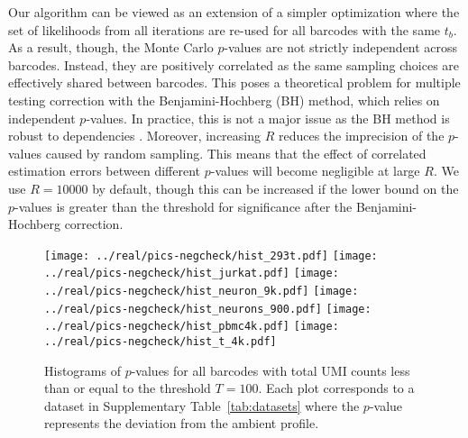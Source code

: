 \documentclass{article}
\begin{document}
Our algorithm can be viewed as an extension of a simpler optimization where the set of likelihoods from all iterations are re-used for all barcodes with the same $t_b$.
As a result, though, the Monte Carlo $p$-values are not strictly independent across barcodes.
Instead, they are positively correlated as the same sampling choices are effectively shared between barcodes.
This poses a theoretical problem for multiple testing correction with the Benjamini-Hochberg (BH) method, which relies on independent $p$-values.
In practice, this is not a major issue as the BH method is robust to dependencies \cite{reiner2003identifying,kim2008effects}.
Moreover, increasing $R$ reduces the imprecision of the $p$-values caused by random sampling.
This means that the effect of correlated estimation errors between different $p$-values will become negligible at large $R$.
We use $R=10000$ by default, though this can be increased if the lower bound on the $p$-values \cite{phipson2010permutation} is greater than the threshold for significance after the Benjamini-Hochberg correction.




\newpage
\begin{figure}[btp]
    \begin{center}
        \texttt{[image: ../real/pics-negcheck/hist\_293t.pdf]}
        \texttt{[image: ../real/pics-negcheck/hist\_jurkat.pdf]}
        \texttt{[image: ../real/pics-negcheck/hist\_neuron\_9k.pdf]}
        \texttt{[image: ../real/pics-negcheck/hist\_neurons\_900.pdf]}
        \texttt{[image: ../real/pics-negcheck/hist\_pbmc4k.pdf]}
        \texttt{[image: ../real/pics-negcheck/hist\_t\_4k.pdf]}
    \end{center}
    \caption{Histograms of $p$-values for all barcodes with total UMI counts less than or equal to the threshold $T=100$.
        Each plot corresponds to a dataset in Supplementary Table~\ref{tab:datasets} where the $p$-value represents the deviation from the ambient profile.
    }
    \label{fig:negative}
\end{figure}
\end{document}
